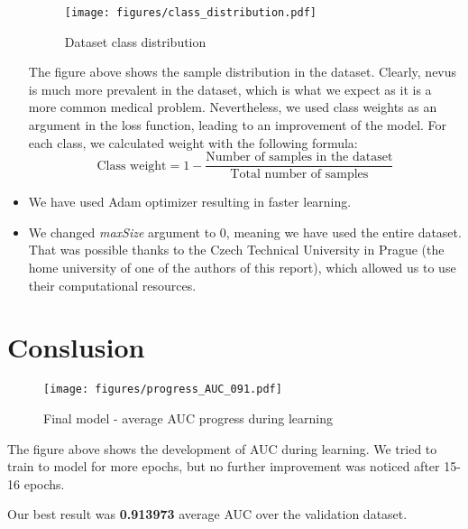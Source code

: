 \documentclass{article}
\begin{document}
\begin{itemize}
\begin{figure}[H]
\centering
\texttt{[image: figures/class\_distribution.pdf]}
\caption{Dataset class distribution}
\end{figure}


The figure above shows the sample distribution in the dataset. Clearly, nevus is much more prevalent in the dataset, which is what we expect as it is a more common medical problem. \cite{wiki} Nevertheless, we used class weights as an argument in the loss function, leading to an improvement of the model. For each class, we calculated weight with the following formula: 
$$\text{Class weight}=1-\frac{\text{Number of samples in the dataset}}{\text{Total number of samples}}$$
\item We have used Adam optimizer resulting in faster learning.
\item We changed \textit{maxSize} argument to 0, meaning we have used the entire dataset. That was possible thanks to the Czech Technical University in Prague (the home university of one of the authors of this report), which allowed us to use their computational resources. \cite{ctu}
\end{itemize}


\section*{Conslusion}
\begin{figure}[H]
\centering
\texttt{[image: figures/progress\_AUC\_091.pdf]}
\caption{Final model - average AUC progress during learning}
\end{figure}
The figure above shows the development of AUC during learning. We tried to train to model for more epochs, but no further improvement was noticed after 15-16 epochs.

Our best result was \textbf{0.913973} average AUC over the validation dataset.
\end{document}
